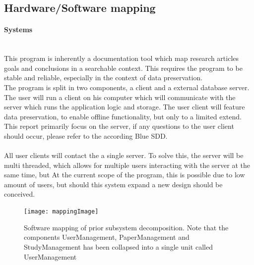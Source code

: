 \subsection{Hardware/Software mapping}
\paragraph{Systems}\mbox{}\\
This program is inherently a documentation tool which map research articles goals and conclusions in a searchable context. This requires the program to be stable and reliable, especially  in the context of data preservation. \\The program is split in two components, a client and a external database  server. The user will run a client on his computer which will communicate with the server which runs the application logic and storage. The user client will feature data preservation, to enable offline functionality, but only to a limited extend. This report primarily focus on the server, if any questions to the user client should occur,  please refer to the according Blue SDD.\\ \\
All user clients will contact the a single server. To solve this, the server will be multi threaded, which allows for multiple users interacting with the server at the same time, but  At the current scope of the program, this is possible due to low amount of users, but should this system expand a new design should be conceived. \\
\begin{figure}[H]
	\texttt{[image: mappingImage]}
	\caption{ Software mapping of prior subsystem decomposition. Note that the components UserManagement, PaperManagement and StudyManagement has been collapsed into a single unit called UserManagement }
\end{figure}

